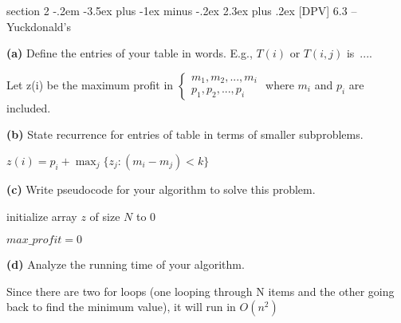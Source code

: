 \documentclass{article}
\makeatletter
\newenvironment{problem}{\@startsection
       {section}
       {2}
       {-.2em}
       {-3.5ex plus -1ex minus -.2ex}
       {2.3ex plus .2ex}
       {\pagebreak[3]%
       \large\bf\noindent{Problem }
       }
       }
\makeatother
\begin{document}
\begin{problem}{[DPV] 6.3 -- Yuckdonald's}


{\bf (a) } Define the entries of your table in words.  E.g., $T(i)$ or $T(i,j)$ is~....

\vspace{.25in}
Let z(i) be the maximum profit in $\left\{\begin{matrix}
m_1, m_2, ... , m_i\\ 
p_1, p_2, ... , p_i
\end{matrix}\right.$ where $m_i$ and $p_i$ are included. 

\vspace{3in}

{\bf (b) } State recurrence for entries of table in
terms of smaller subproblems.

\vspace{.25in}
$z(i) = p_i + \max_j\{ z_j : (m_i - m_j) < k \}$

\newpage

{\bf (c) }  Write pseudocode for your algorithm to solve this problem.

\begin{algorithm}
	\BlankLine
	
	initialize array $z$ of size $N$ to 0\;
	
	$max\_profit = 0$
\end{algorithm}

\vspace{2in}

{\bf (d) } Analyze the running time of your algorithm.

\vspace{.25in}
Since there are two for loops (one looping through N items and the other going back to find the minimum value), it will run in $O(n^2)$
 

\end{problem}


\newpage
\end{document}
